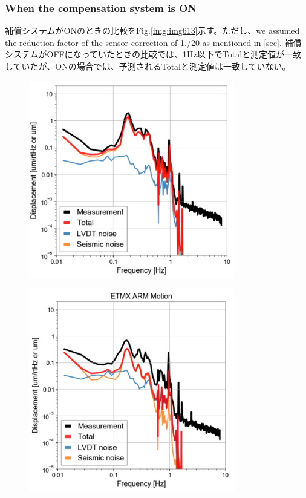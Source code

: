 \subsubsection{When the compensation system is ON}
補償システムがONのときの比較をFig.\ref{img:img613}示す。ただし、we assumed the reduction factor of the sensor correction of 1./20 as mentioned in \cref{sec}. 補償システムがOFFになっていたときの比較では、1Hz以下でTotalと測定値が一致していたが、ONの場合では、予測されるTotalと測定値は一致していない。





\begin{figure}[p]
  \begin{minipage}{15cm}
    \begin{center}   
      \includegraphics[width=9cm]{./img_chap6/img612.png}
      \label{img:img612} \hfill\vspace{10pt}
    \end{center}
  \end{minipage}
  \begin{minipage}{15cm}
    \begin{center}   
      \includegraphics[width=9cm]{./img_chap6/img613.png}

\end{center}
\end{minipage}
\end{figure}
